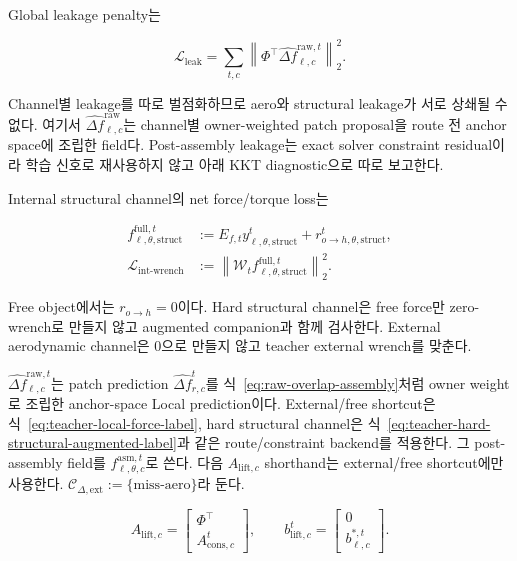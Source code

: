 \documentclass[11pt,a4paper]{article}
\begin{document}
Global leakage penalty는

\begin{equation}
  \mathcal L_{\mathrm{leak}}
  =
  \sum_{t,c}
  \left\|
  \Phi^\top \widehat{\Delta f}_{\ell,c}^{\mathrm{raw},t}
  \right\|_2^2.
\end{equation}

Channel별 leakage를 따로 벌점화하므로 aero와 structural leakage가 서로 상쇄될 수 없다.
여기서 \(\widehat{\Delta f}_{\ell,c}^{\mathrm{raw}}\)는 channel별 owner-weighted
patch proposal을 route 전 anchor space에 조립한 field다. Post-assembly leakage는 exact solver
constraint residual이라 학습 신호로 재사용하지 않고 아래 KKT diagnostic으로 따로 보고한다.

Internal structural channel의 net force/torque loss는

\begin{equation}
\begin{aligned}
  f_{\ell,\theta,\mathrm{struct}}^{\mathrm{full},t}
  &:={}E_{f,t}y_{\ell,\theta,\mathrm{struct}}^t
  +r_{o\rightarrow h,\theta,\mathrm{struct}}^t,\\
  \mathcal L_{\mathrm{int\mbox{-}wrench}}
  &:={}\left\|
  \mathcal W_t f_{\ell,\theta,\mathrm{struct}}^{\mathrm{full},t}
  \right\|_2^2 .
\end{aligned}
\end{equation}

Free object에서는 \(r_{o\rightarrow h}=0\)이다.
Hard structural channel은 free force만 zero-wrench로 만들지 않고 augmented companion과 함께 검사한다.
External aerodynamic channel은 0으로 만들지 않고 teacher external wrench를 맞춘다.

\(\widehat{\Delta f}_{\ell,c}^{\mathrm{raw},t}\)는 patch prediction
\(\widehat{\Delta f}_{r,c}^t\)를 식~\eqref{eq:raw-overlap-assembly}처럼
owner weight로 조립한 anchor-space Local prediction이다.
External/free shortcut은 식~\eqref{eq:teacher-local-force-label}, hard structural channel은
식~\eqref{eq:teacher-hard-structural-augmented-label}과 같은 route/constraint backend를 적용한다.
그 post-assembly field를 \(f_{\ell,\theta,c}^{\mathrm{asm},t}\)로 쓴다.
다음 \(A_{\mathrm{lift},c}\) shorthand는 external/free shortcut에만 사용한다.
\(\mathcal C_{\Delta,\mathrm{ext}}:=\{\mathrm{miss\mbox{-}aero}\}\)라 둔다.

\begin{equation}
  A_{\mathrm{lift},c}
  =
  \begin{bmatrix}\Phi^\top\\A_{\mathrm{cons},c}^t\end{bmatrix},
  \qquad
  b_{\mathrm{lift},c}^t
  =
  \begin{bmatrix}0\\b_{\ell,c}^{*,t}\end{bmatrix}.
\end{equation}
\end{document}
